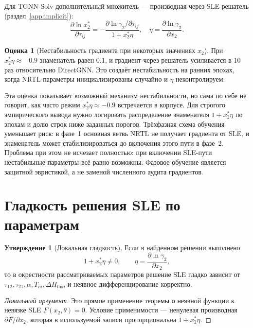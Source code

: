 \documentclass[11pt]{article}
\newcommand{\dHfus}{\Delta H_{\mathrm{fus}}}
\theoremstyle{definition}
\newtheorem{estimate}{Оценка}[section]
\newtheorem{claim}{Утверждение}[section]
\begin{document}
Для TGNN-Solv дополнительный множитель --- производная через SLE-решатель (раздел~\ref{app:implicit}):
\begin{equation}
    \frac{\partial \ln x_2^*}{\partial \tau_{ij}} = -\frac{\partial \ln\gamma_2/\partial\tau_{ij}}{1 + x_2^* \eta},
    \quad
    \eta = \frac{\partial\ln\gamma_2}{\partial x_2}.
\end{equation}

\begin{estimate}[Нестабильность градиента при некоторых значениях $x_2$]
При $x_2^* \eta \approx -0.9$ знаменатель равен $0.1$, и градиент через решатель усиливается в $10$ раз относительно DirectGNN. Это создаёт нестабильность на ранних эпохах, когда NRTL-параметры инициализированы случайно и $\eta$ неконтролируем.
\end{estimate}

Эта оценка показывает возможный механизм нестабильности, но сама по себе не говорит, как часто режим $x_2^*\eta\approx-0.9$ встречается в корпусе. Для строгого эмпирического вывода нужно логировать распределение знаменателя $1+x_2^*\eta$ по эпохам и долю строк ниже заданных порогов. Трёхфазная схема обучения уменьшает риск: в фазе~1 основная ветвь NRTL не получает градиента от SLE, и знаменатель может стабилизироваться до включения этого пути в фазе~2. Проблема при этом не исчезает полностью: при включении SLE-пути нестабильные параметры всё равно возможны. Фазовое обучение является защитной эвристикой, а не заменой численного аудита градиентов.

\section{Гладкость решения SLE по параметрам}
\label{app:smoothness-implicit}

\begin{claim}[Локальная гладкость]
Если в найденном решении выполнено
\begin{equation*}
    1+x_2^*\eta \ne 0,
    \qquad
    \eta=\frac{\partial \ln\gamma_2}{\partial x_2},
\end{equation*}
то в окрестности рассматриваемых параметров решение SLE гладко зависит от $\tau_{12},\tau_{21},\alpha,T_m,\dHfus$, и неявное дифференцирование корректно.
\end{claim}

\begin{proof}[Локальный аргумент]
Это прямое применение теоремы о неявной функции к невязке SLE $F(x_2,\theta)=0$. Условие применимости --- ненулевая производная $\partial F/\partial x_2$, которая в используемой записи пропорциональна $1+x_2^*\eta$.
\end{proof}
\end{document}
